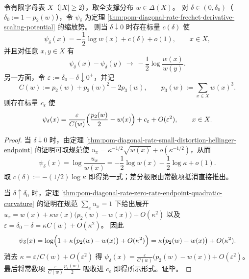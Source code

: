 

\begin{theorem}[缩放势的两端点渐近]\label{thm:pom-diagonal-rate-scaling-potential-endpoints}
令有限字母表 \(X\)（\(|X|\ge 2\)），取全支撑分布 \(w\in\Delta(X)\)。
对 \(\delta\in(0,\delta_0)\)（\(\delta_0:=1-p_2(w)\)），令 \(\psi_\delta\) 为定理 \ref{thm:pom-diagonal-rate-frechet-derivative-scaling-potential} 的缩放势。
则当 \(\delta\downarrow 0\) 时存在标量 \(c(\delta)\) 使
\[
\psi_\delta(x)= -\frac12\log w(x)+c(\delta)+o(1),\qquad x\in X,
\]
并且对任意 \(x,y\in X\) 有
\[
\psi_\delta(x)-\psi_\delta(y)\ \longrightarrow\ -\frac12\log\frac{w(x)}{w(y)}.
\]
另一方面，令 \(\varepsilon:=\delta_0-\delta\downarrow 0^+\)，并记
\[
C(w):=p_2(w)+p_2(w)^2-2p_3(w),\qquad p_3(w):=\sum_{x\in X}w(x)^3.
\]
则存在标量 \(c_\varepsilon\) 使
\[
\psi_\delta(x)=\frac{\varepsilon}{C(w)}\Bigl(\frac{p_2(w)}{2}-w(x)\Bigr)+c_\varepsilon+O(\varepsilon^2),
\qquad x\in X.
\]
\end{theorem}
\begin{proof}
当 \(\delta\downarrow 0\) 时，由定理 \ref{thm:pom-diagonal-rate-small-distortion-hellinger-endpoint} 的证明可取规范使 \(u_x=\kappa^{-1/2}\sqrt{w(x)}+o(\kappa^{-1/2})\)，从而
\[
\psi_\delta(x)=\log\frac{u_x}{w(x)}=-\frac12\log w(x)-\frac12\log\kappa+o(1).
\]
取 \(c(\delta):=-(1/2)\log\kappa\) 即得第一式；差分极限由常数项抵消直接推出。
\par
当 \(\delta\uparrow\delta_0\) 时，定理 \ref{thm:pom-diagonal-rate-zero-rate-endpoint-quadratic-curvature} 的证明在规范 \(\sum_x u_x=1\) 下给出展开
\(
u_x=w(x)+\kappa w(x)\bigl(p_2(w)-w(x)\bigr)+O(\kappa^2)
\)
以及
\(
\varepsilon=\delta_0-\delta=\kappa C(w)+O(\kappa^2)
\)。
因此
\[
\psi_\delta(x)=\log\Bigl(1+\kappa\bigl(p_2(w)-w(x)\bigr)+O(\kappa^2)\Bigr)
=\kappa\bigl(p_2(w)-w(x)\bigr)+O(\kappa^2).
\]
消去 \(\kappa=\varepsilon/C(w)+O(\varepsilon^2)\) 得
\(
\psi_\delta(x)=\frac{\varepsilon}{C(w)}\bigl(p_2(w)-w(x)\bigr)+O(\varepsilon^2)
\)。
最后将常数项 \(\frac{\varepsilon}{C(w)}\frac{p_2(w)}{2}\) 吸收进 \(c_\varepsilon\) 即得所示形式。证毕。
\end{proof}

